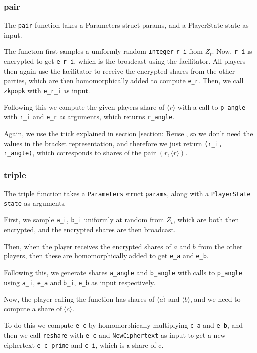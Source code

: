 \documentclass[../main.tex]{subfiles}
\begin{document}
\subsubsection{pair}
The \lstinline{pair} function takes a Parameters struct params, and a PlayerState state as input.

The function first samples a uniformly random \lstinline{Integer} \lstinline{r_i} from $Z_t$. Now, \lstinline{r_i} is encrypted to get \lstinline{e_r_i}, which is the broadcast using the facilitator. All players then again use the facilitator to receive the encrypted shares from the other parties, which are then homomorphically added to compute \lstinline{e_r}. Then, we call \lstinline{zkpopk} with \lstinline{e_r_i} as input.

Following this we compute the given players share of $\langle r \rangle$ with a call to \lstinline{p_angle} with \lstinline{r_i} and \lstinline{e_r} as arguments, which returns \lstinline{r_angle}.

Again, we use the trick explained in section \ref{section: Reuse}, so we don't need the values in the bracket representation, and therefore we just return \lstinline{(r_i, r_angle)}, which corresponds to shares of the pair $(r, \langle r \rangle)$.

\subsubsection{triple}
The triple function takes a \lstinline{Parameters} struct \lstinline{params}, along with a \lstinline{PlayerState} \lstinline{state} as arguments.

First, we sample \lstinline{a_i}, \lstinline{b_i} uniformly at random from $Z_t$, which are both then encrypted, and the encrypted shares are then broadcast.

Then, when the player receives the encrypted shares of $a$ and $b$ from the other players, then these are homomorphically added to get \lstinline{e_a} and \lstinline{e_b}.

Following this, we generate shares \lstinline{a_angle} and \lstinline{b_angle} with calls to \lstinline{p_angle} using \lstinline{a_i}, \lstinline{e_a} and \lstinline{b_i}, \lstinline{e_b} as input respectively.

Now, the player calling the function has shares of $\langle a \rangle$ and $\langle b \rangle$, and we need to compute a share of $\langle c \rangle$.

To do this we compute \lstinline{e_c} by homomorphically multiplying \lstinline{e_a} and \lstinline{e_b}, and then we call \lstinline{reshare} with \lstinline{e_c} and \lstinline{NewCiphertext} as input to get a new ciphertext \lstinline{e_c_prime} and \lstinline{c_i}, which is a share of c. 
\end{document}
